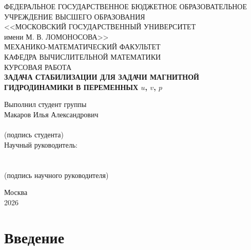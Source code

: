 \documentclass[12pt,a4paper]{article}
\begin{document}
\begin{titlepage}
\begin{center}
ФЕДЕРАЛЬНОЕ ГОСУДАРСТВЕННОЕ БЮДЖЕТНОЕ ОБРАЗОВАТЕЛЬНОЕ \\
УЧРЕЖДЕНИЕ ВЫСШЕГО ОБРАЗОВАНИЯ \\
<<МОСКОВСКИЙ ГОСУДАРСТВЕННЫЙ УНИВЕРСИТЕТ \\
имени М. В. ЛОМОНОСОВА>>\\
\vspace{4ex}
МЕХАНИКО-МАТЕМАТИЧЕСКИЙ ФАКУЛЬТЕТ\\
\vspace{4ex}
КАФЕДРА ВЫЧИСЛИТЕЛЬНОЙ МАТЕМАТИКИ\\
\vspace{20ex}
КУРСОВАЯ РАБОТА\\
\vspace{2ex}
\textbf{ЗАДАЧА СТАБИЛИЗАЦИИ ДЛЯ ЗАДАЧИ МАГНИТНОЙ ГИДРОДИНАМИКИ В ПЕРЕМЕННЫХ \(u\), \(v\), \(p\)}\\
\vspace{15ex}
\begin{flushright}
Выполнил студент \underline{\hspace{15mm}} группы\\
Макаров Илья Александрович\\
\vspace{4ex}
\underline{\qquad\qquad\qquad\qquad\qquad\qquad\qquad\qquad}\\
(подпись студента)\\
\vspace{4ex}
Научный руководитель: \\
\underline{\qquad\qquad\qquad\qquad\qquad\qquad\qquad\qquad}\\
\vspace{4ex}
\underline{\qquad\qquad\qquad\qquad\qquad\qquad\qquad\qquad}\\
(подпись научного руководителя)
\end{flushright}
\vfill
Москва\\
\vspace{2ex}
2026
\end{center}
\end{titlepage}

\tableofcontents
\newpage

\section*{Введение}
\end{document}
